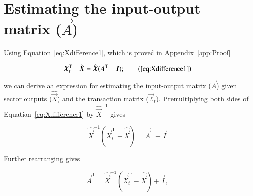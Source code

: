 %
%
%

\chapter{Estimating the input-output matrix ($\vec{A}$)}
\label{chap:Estimating_A} 


Using Equation~\ref{eq:Xdifference1}, which is proved in Appendix~\ref{app:Proof}

\begin{equation}
	\vec{X}_{t}^\mathrm{T} 
	- \hat{\vec{X}} 
	= \hat{\vec{X}}(\vec{A}^\mathrm{T} - \vec{I});
	\tag{\ref{eq:Xdifference1}}
\end{equation}

\noindent{}we can derive an expression for estimating the input-output matrix ($\vec{A}$)
given sector outputs ($\hat{\vec{X}}$) and the transaction matrix ($\vec{X}_{t}$).
Premultiplying both sides of Equation~\ref{eq:Xdifference1} by $\hat{\vec{X}}^{-1}$ gives

\begin{equation} \label{eq:Xdifference1Proof-5}
	\hat{\vec{X}}^{-1}
	\left( 
		\vec{X}_{t}^\mathrm{T} 
		- \hat{\vec{X}} 
	\right)
	= \vec{A}^\mathrm{T} - \vec{I}
\end{equation}

\noindent{}Further rearranging gives

\begin{equation}\label{eq:Xdifference1Proof-6}
	\vec{A}^\mathrm{T} 
	= \hat{\vec{X}}^{-1}
	\left( 
		\vec{X}_{t}^\mathrm{T} 
		- \hat{\vec{X}} 
	\right)
	+ \vec{I},
\end{equation}

